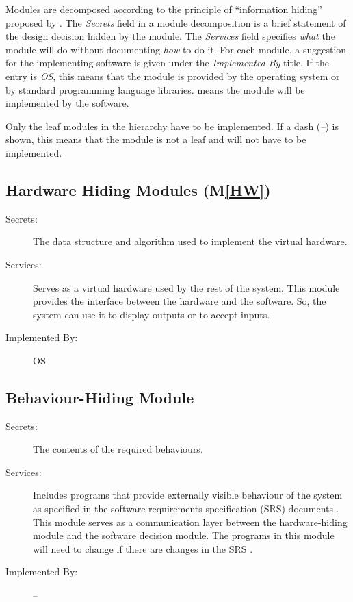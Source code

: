 \documentclass[12pt, titlepage]{article}
\newcommand{\mref}[1]{M\ref{#1}}
\begin{document}
Modules are decomposed according to the principle of ``information hiding''
proposed by \citet{ParnasEtAl1984}. The \emph{Secrets} field in a module
decomposition is a brief statement of the design decision hidden by the
module. The \emph{Services} field specifies \emph{what} the module will do
without documenting \emph{how} to do it. For each module, a suggestion for the
implementing software is given under the \emph{Implemented By} title. If the
entry is \emph{OS}, this means that the module is provided by the operating
system or by standard programming language libraries.  \emph{\progname{}} means the
module will be implemented by the \progname{} software.

Only the leaf modules in the hierarchy have to be implemented. If a dash
(\emph{--}) is shown, this means that the module is not a leaf and will not have
to be implemented.

\subsection{Hardware Hiding Modules (\mref{HW})}

\begin{description}
\item[Secrets:]The data structure and algorithm used to implement the virtual
  hardware.
\item[Services:]Serves as a virtual hardware used by the rest of the
  system. This module provides the interface between the hardware and the
  software. So, the system can use it to display outputs or to accept inputs.
\item[Implemented By:] OS
\end{description}

\subsection{Behaviour-Hiding Module}

\begin{description}
\item[Secrets:]The contents of the required behaviours.
\item[Services:]Includes programs that provide externally visible behaviour of
  the system as specified in the software requirements specification (SRS)
  documents \cite{SRS}. This module serves as a communication layer between the
  hardware-hiding module and the software decision module. The programs in this
  module will need to change if there are changes in the SRS \cite{SRS}.
\item[Implemented By:] --
\end{description}
\end{document}
